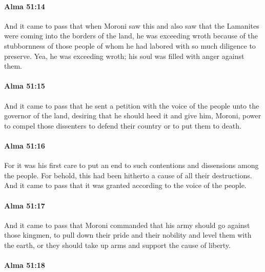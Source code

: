 		\paragraph{Alma 51:14} %
			\label{ALMA-51-14}

			And it came to pass that when Moroni saw this
			and also saw that the Lamanites were coming into the borders of the land,
			he was exceeding wroth because of the stubbornness of those people
			of whom he had labored with so much diligence to preserve.
			Yea, he was exceeding wroth;
			his soul was filled with anger against them.

		\paragraph{Alma 51:15} %
			\label{ALMA-51-15}

			And it came to pass that he sent a petition
			with the voice of the people unto the governor of the land,
			desiring that he should heed it
			and give him, Moroni, power to compel those dissenters
			to defend their country or to put them to death.

		\paragraph{Alma 51:16} %
			\label{ALMA-51-16}

			For it was his first care to put an end
			to such contentions and dissensions among the people.
			For behold, this had been hitherto a cause of all their destructions.
			And it came to pass that it was granted according to the voice of the people.

		\paragraph{Alma 51:17} %
			\label{ALMA-51-17}

			And it came to pass that Moroni commanded
			that his army should go against those kingmen,
			to pull down their pride and their nobility
			and level them with the earth,
			or they should take up arms and support the cause of liberty.

		\paragraph{Alma 51:18} %
			\label{ALMA-51-18}

